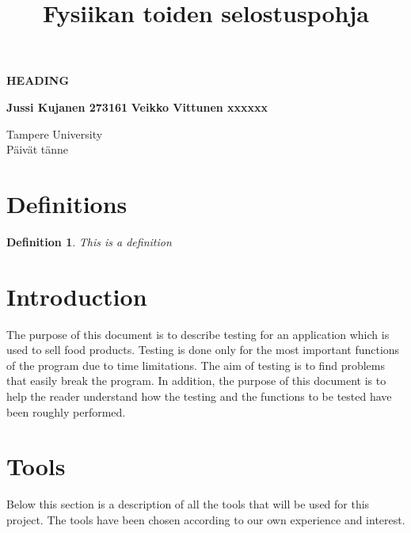 \documentclass[a4paper, 12pt]{article}
\title{Fysiikan toiden selostuspohja}
\newtheorem{definition}{Definition}
\begin{document}
\begin{titlepage}
    \begin{center}
        \vspace*{1cm}
 
        \textbf{HEADING}
 
        \vspace{0.5cm}
       
             
        \vspace{1.5cm}
 
        \textbf{Jussi Kujanen 273161}
        \textbf{Veikko Vittunen xxxxxx}
 
        \vfill
             
    
             
        \vspace{0.8cm}
      
   
             
       
        Tampere University\\
       Päivät tänne
             
    \end{center}
 \end{titlepage} 



\newpage
\thispagestyle{empty}
\tableofcontents

\newpage
\clearpage
{} 

\section{Definitions}
\begin{definition}
    This is a definition
\end{definition}
\section{Introduction}
The purpose of this document is to describe testing for an application which is used to sell food products. Testing is done only for the most important 
functions of the program due to time limitations. The aim of testing is to find problems that easily break the program. In addition, the purpose of this 
document is to help the reader understand how the testing and the functions to be tested have been roughly performed. 
\section{Tools}
Below this section is a description of all the tools that will be used for this project. The tools have been chosen according to our own experience and interest. 
\end{document}
